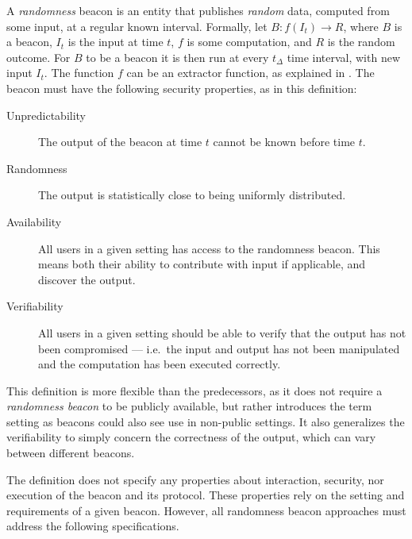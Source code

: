 A \emph{randomness} beacon is an entity that publishes \emph{random} data, computed from some input, at a regular known interval.
Formally, let $B: f(I_t) \rightarrow R$, where $B$ is a beacon, $I_t$ is the input at time $t$, $f$ is some computation, and $R$ is the random outcome.
For $B$ to be a beacon it is then run at every $t_\Delta$ time interval, with new input $I_t$.
The function $f$ can be an extractor function, as explained in .
The beacon must have the following security properties, as in this definition:

\begin{description}
    \item[Unpredictability] The output of the beacon at time $t$ cannot be known before time $t$.
    \item[Randomness] The output is statistically close to being uniformly distributed.
    \item[Availability] All users in a given setting has access to the randomness beacon.
       This means both their ability to contribute with input if applicable, and discover the output.
    \item[Verifiability] All users in a given setting should be able to verify that the output has not been compromised --- i.e.\ the input and output has not been manipulated and the computation has been executed correctly.
\end{description}

This definition is more flexible than the predecessors, as it does not require a \emph{randomness beacon} to be publicly available, but rather introduces the term setting as beacons could also see use in non-public settings.
It also generalizes the verifiability to simply concern the correctness of the output, which can vary between different beacons.

The definition does not specify any properties about interaction, security, nor execution of the beacon and its protocol.
These properties rely on the setting and requirements of a given beacon.
However, all randomness beacon approaches must address the following specifications.
